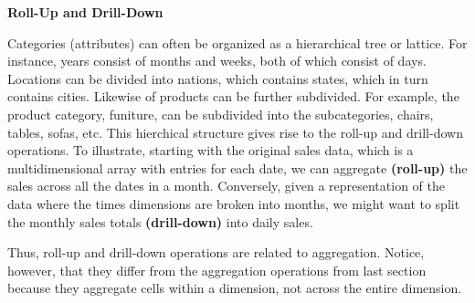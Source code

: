 		{\bf Roll-Up and Drill-Down}

			Categories (attributes) can often be organized as a hierarchical tree or lattice.
			For instance, years consist of months and weeks, both of which consist of days.
			Locations can be divided into nations, which contains states, which in turn
			contains cities. Likewise of products can be further subdivided. For example,
			the product category, funiture, can be subdivided into the subcategories,
			chairs, tables, sofas, etc. This hierchical structure gives rise to  the 
			roll-up and drill-down operations. To illustrate, starting with the original
			sales data, which is a multidimensional array with entries for each date,
			we can aggregate {\bf (roll-up)} the sales across all the dates in a month. 
			Conversely, given a representation of the data where the times dimensions are
			broken into months, we might want to split the monthly sales totals 
			{\bf (drill-down)} into daily sales. 

			Thus, roll-up and drill-down operations are related to aggregation. Notice, 
			however, that they differ from the aggregation operations from last section
			because they aggregate cells within a dimension, not across the entire  dimension. 
			